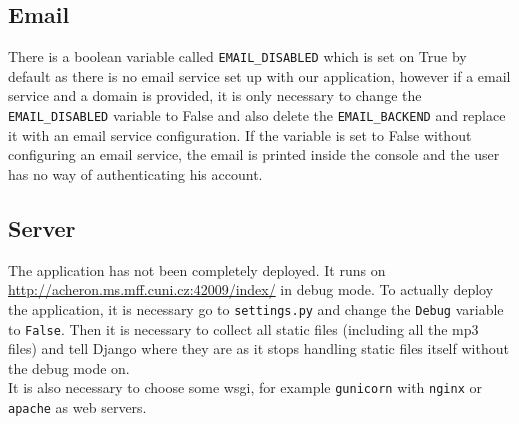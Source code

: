 \subsection{Email}
There is a boolean variable called \texttt{EMAIL\_DISABLED} which is set on True by default as there is no email service set up with our application, however if a email service and a domain is provided, it is only necessary to change the \texttt{EMAIL\_DISABLED} variable to False and also delete the \texttt{EMAIL\_BACKEND} and replace it with an email service configuration. If the variable is set to False without configuring an email service, the email is printed inside the console and the user has no way of authenticating his account.

\subsection{Server}

The application has not been completely deployed. It runs on \url{http://acheron.ms.mff.cuni.cz:42009/index/} in debug mode. To actually deploy the application, it is necessary go to \texttt{settings.py} and change the \texttt{Debug} variable to \texttt{False}. Then it is necessary to collect all static files (including all the mp3 files) and tell Django where they are as it stops handling static files itself without the debug mode on.\\
It is also necessary to choose some wsgi, for example \texttt{gunicorn} with \texttt{nginx} or \texttt{apache} as web servers.






